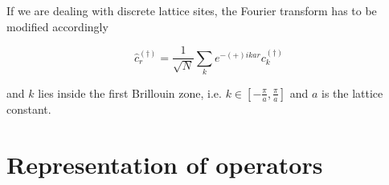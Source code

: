 If we are dealing with discrete lattice sites, the Fourier transform has to be modified accordingly

\begin{equation}
    \hat{c}_{r}^{(\dagger)} = \frac{1}{\sqrt{N}} \sum_{k}e^{-(+)ikar}c_{k}^{(\dagger)}
\end{equation}

and $k$ lies inside the first Brillouin zone, i.e. $k \in \left[-\frac{\pi}{a},\frac{\pi}{a}\right]$ and $a$ is the lattice constant.

\section{Representation of operators}

